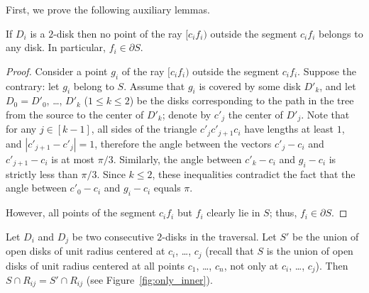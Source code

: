 
First, we prove the following auxiliary lemmas.

\begin{lemma}
If $D_i$ is a $2$-disk then no point of the ray $[c_if_i)$ outside the segment $c_if_i$ belongs to any disk. In particular, $f_i\in\partial S$.
\label{lemma:far}
\end{lemma}

\begin{proof}
Consider a point $g_i$ of the ray $[c_if_i)$ outside the segment $c_if_i$. Suppose the contrary: let $g_i$ belong to $S$.
Assume that $g_i$ is covered by some disk $D'_k$, and let $D_0 = D'_0$, \ldots, $D'_k$ ($1\leq k\leq 2$) be the disks corresponding to the path in the tree from the source to the center of $D'_k$; denote by $c'_j$ the center of $D'_j$.
Note that for any $j\in[k - 1]$, all sides of the triangle $c'_jc'_{j+1}c_i$ have lengths at least $1$, and $|c'_{j+1} - c'_j| = 1$, therefore the angle between the vectors $c'_j - c_i$ and $c'_{j+1} - c_i$ is at most $\pi/3$. Similarly, the angle between $c'_k - c_i$ and $g_i - c_i$ is strictly less than $\pi/3$. Since $k\leq 2$, these inequalities contradict the fact that the angle between $c'_0 - c_i$ and $g_i - c_i$ equals $\pi$.

However, all points of the segment $c_if_i$ but $f_i$ clearly lie in $S$; thus, $f_i\in\partial{S}$.
\end{proof}


\begin{lemma}
Let $D_i$ and $D_j$ be two consecutive $2$-disks in the traversal. Let $S'$ be the union of open disks of unit radius centered at $c_i$, \ldots, $c_j$ (recall that $S$ is the union of open disks of unit radius centered at all points $c_1$, \ldots, $c_n$, not only at $c_i$, \ldots, $c_j$). Then $S\cap R_{ij} = S'\cap R_{ij}$  (see Figure~\ref{fig:only_inner}).

\label{lemma:only_inner}
\end{lemma}

